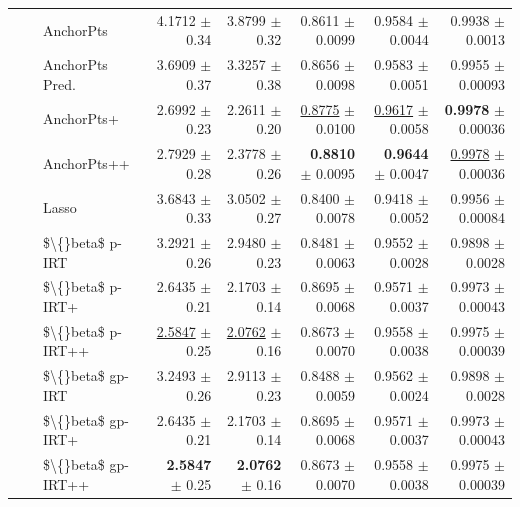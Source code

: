 \begin{longtable}{llp{}rrrrr}
 &  & AnchorPts & 4.1712 {\scriptsize $\pm$ 0.34} & 3.8799 {\scriptsize $\pm$ 0.32} & 0.8611 {\scriptsize $\pm$ 0.0099} & 0.9584 {\scriptsize $\pm$ 0.0044} & 0.9938 {\scriptsize $\pm$ 0.0013} \\
 &  & AnchorPts Pred. & 3.6909 {\scriptsize $\pm$ 0.37} & 3.3257 {\scriptsize $\pm$ 0.38} & 0.8656 {\scriptsize $\pm$ 0.0098} & 0.9583 {\scriptsize $\pm$ 0.0051} & 0.9955 {\scriptsize $\pm$ 0.00093} \\
 &  & AnchorPts+ & 2.6992 {\scriptsize $\pm$ 0.23} & 2.2611 {\scriptsize $\pm$ 0.20} & \underline{0.8775} {\scriptsize $\pm$ 0.0100} & \underline{0.9617} {\scriptsize $\pm$ 0.0058} & \textbf{0.9978} {\scriptsize $\pm$ 0.00036} \\
 &  & AnchorPts++ & 2.7929 {\scriptsize $\pm$ 0.28} & 2.3778 {\scriptsize $\pm$ 0.26} & \textbf{0.8810} {\scriptsize $\pm$ 0.0095} & \textbf{0.9644} {\scriptsize $\pm$ 0.0047} & \underline{0.9978} {\scriptsize $\pm$ 0.00036} \\
 &  & Lasso & 3.6843 {\scriptsize $\pm$ 0.33} & 3.0502 {\scriptsize $\pm$ 0.27} & 0.8400 {\scriptsize $\pm$ 0.0078} & 0.9418 {\scriptsize $\pm$ 0.0052} & 0.9956 {\scriptsize $\pm$ 0.00084} \\
 &  & \$\textbackslash\{\}beta\$ p-IRT & 3.2921 {\scriptsize $\pm$ 0.26} & 2.9480 {\scriptsize $\pm$ 0.23} & 0.8481 {\scriptsize $\pm$ 0.0063} & 0.9552 {\scriptsize $\pm$ 0.0028} & 0.9898 {\scriptsize $\pm$ 0.0028} \\
 &  & \$\textbackslash\{\}beta\$ p-IRT+ & 2.6435 {\scriptsize $\pm$ 0.21} & 2.1703 {\scriptsize $\pm$ 0.14} & 0.8695 {\scriptsize $\pm$ 0.0068} & 0.9571 {\scriptsize $\pm$ 0.0037} & 0.9973 {\scriptsize $\pm$ 0.00043} \\
 &  & \$\textbackslash\{\}beta\$ p-IRT++ & \underline{2.5847} {\scriptsize $\pm$ 0.25} & \underline{2.0762} {\scriptsize $\pm$ 0.16} & 0.8673 {\scriptsize $\pm$ 0.0070} & 0.9558 {\scriptsize $\pm$ 0.0038} & 0.9975 {\scriptsize $\pm$ 0.00039} \\
 &  & \$\textbackslash\{\}beta\$ gp-IRT & 3.2493 {\scriptsize $\pm$ 0.26} & 2.9113 {\scriptsize $\pm$ 0.23} & 0.8488 {\scriptsize $\pm$ 0.0059} & 0.9562 {\scriptsize $\pm$ 0.0024} & 0.9898 {\scriptsize $\pm$ 0.0028} \\
 &  & \$\textbackslash\{\}beta\$ gp-IRT+ & 2.6435 {\scriptsize $\pm$ 0.21} & 2.1703 {\scriptsize $\pm$ 0.14} & 0.8695 {\scriptsize $\pm$ 0.0068} & 0.9571 {\scriptsize $\pm$ 0.0037} & 0.9973 {\scriptsize $\pm$ 0.00043} \\
 &  & \$\textbackslash\{\}beta\$ gp-IRT++ & \textbf{2.5847} {\scriptsize $\pm$ 0.25} & \textbf{2.0762} {\scriptsize $\pm$ 0.16} & 0.8673 {\scriptsize $\pm$ 0.0070} & 0.9558 {\scriptsize $\pm$ 0.0038} & 0.9975 {\scriptsize $\pm$ 0.00039} \\

\end{longtable}
